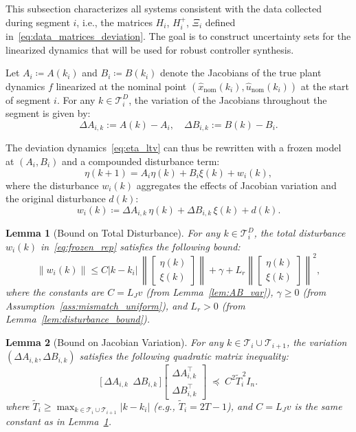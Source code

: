 \documentclass[letterpaper, 10 pt, conference]{ieeeconf}
\newtheorem{lemma}{Lemma}
\begin{document}
This subsection characterizes all systems consistent with the data collected during segment $i$, i.e., the matrices $H_i$, $H_i^+$, $\Xi_i$ defined in~\eqref{eq:data_matrices_deviation}. The goal is to construct uncertainty sets for the linearized dynamics that will be used for robust controller synthesis.

Let $A_i \coloneqq A(k_i)$ and $B_i \coloneqq B(k_i)$ denote the Jacobians of the true plant dynamics $f$ linearized at the nominal point $(\hat{x}_{\text{nom}}(k_i), \hat{u}_{\text{nom}}(k_i))$ at the start of segment $i$. For any $k \in \mathcal{T}_i^D$, the variation of the Jacobians throughout the segment is given by:
\[
\Delta A_{i,k} := A(k) - A_i, \quad \Delta B_{i,k} := B(k) - B_i.
\]

The deviation dynamics~\eqref{eq:eta_ltv} can thus be rewritten with a frozen model at $(A_i, B_i)$ and a compounded disturbance term:
\begin{equation}\label{eq:frozen_rep}
\eta(k+1) = A_i \eta(k) + B_i \xi(k) + w_i(k),
\end{equation}
where the disturbance $w_i(k)$ aggregates the effects of Jacobian variation and the original disturbance $d(k)$:
\[
w_i(k) \coloneqq \Delta A_{i,k} \, \eta(k) + \Delta B_{i,k} \, \xi(k) + d(k).
\]

\begin{lemma}[Bound on Total Disturbance]\label{lem:total_disturbance}
For any $k \in \mathcal{T}_i^D$, the total disturbance $w_i(k)$ in~\eqref{eq:frozen_rep} satisfies the following bound:
\[
\|w_i(k)\| \le C |k - k_i| \, \left\| \begin{bmatrix} \eta(k) \\ \xi(k) \end{bmatrix} \right\| + \gamma + L_r \left\| \begin{bmatrix} \eta(k) \\ \xi(k) \end{bmatrix} \right\|^2,
\]
where the constants are $C = L_J v$ (from Lemma~\ref{lem:AB_var}), $\gamma \ge 0$ (from Assumption~\ref{ass:mismatch_uniform}), and $L_r>0$ (from Lemma~\ref{lem:disturbance_bound}).
\end{lemma}

\begin{lemma}[Bound on Jacobian Variation]\label{lem:jacobian_variation}
For any $k \in \mathcal{T}_i \cup \mathcal{T}_{i+1}$, the variation $(\Delta A_{i,k}, \Delta B_{i,k})$ satisfies the following quadratic matrix inequality:
\begin{equation}\label{eq:bound-on-DeltaAB}
\big[\,\Delta A_{i,k}\ \ \Delta B_{i,k}\,\big]
\begin{bmatrix}
\Delta A_{i,k}^\top\\[2pt]
\Delta B_{i,k}^\top
\end{bmatrix}
\;\preceq\; C^2 \widetilde T_i^{\,2} I_n .
\end{equation}
where $\widetilde T_i \ge \max_{k \in \mathcal{T}_i \cup \mathcal{T}_{i+1}} |k - k_i|$ (e.g., $\widetilde T_i = 2T-1$), and $C = L_J v$ is the same constant as in Lemma~\ref{lem:total_disturbance}.
\end{lemma}
\end{document}
